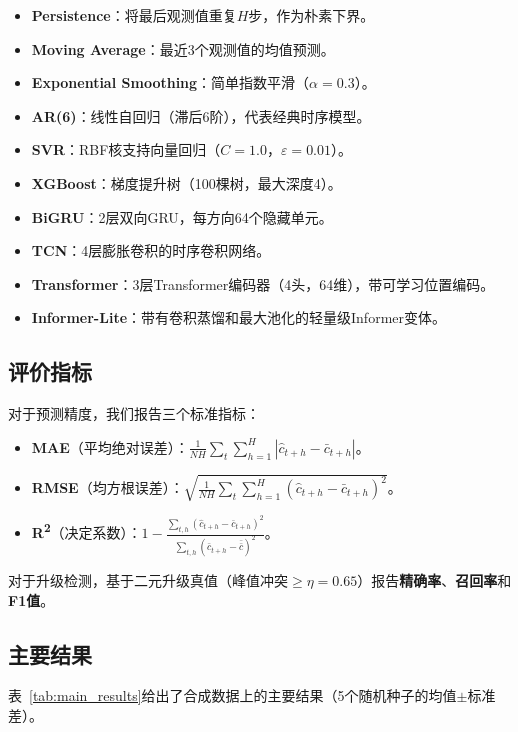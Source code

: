 \documentclass[conference]{IEEEtran}
\begin{document}
\begin{itemize}
\item \textbf{Persistence}：将最后观测值重复$H$步，作为朴素下界。
\item \textbf{Moving Average}：最近3个观测值的均值预测。
\item \textbf{Exponential Smoothing}：简单指数平滑（$\alpha{=}0.3$）。
\item \textbf{AR(6)}：线性自回归（滞后6阶），代表经典时序模型。
\item \textbf{SVR}：RBF核支持向量回归（$C{=}1.0$，$\varepsilon{=}0.01$）。
\item \textbf{XGBoost}：梯度提升树（100棵树，最大深度4）。
\item \textbf{BiGRU}：2层双向GRU，每方向64个隐藏单元。
\item \textbf{TCN}：4层膨胀卷积的时序卷积网络。
\item \textbf{Transformer}：3层Transformer编码器（4头，64维），带可学习位置编码。
\item \textbf{Informer-Lite}：带有卷积蒸馏和最大池化的轻量级Informer变体。
\end{itemize}

\subsection{评价指标}

对于预测精度，我们报告三个标准指标：

\begin{itemize}
\item \textbf{MAE}（平均绝对误差）：$\frac{1}{N H}\sum_{t}\sum_{h=1}^{H}|\hat{c}_{t+h}-\bar{c}_{t+h}|$。
\item \textbf{RMSE}（均方根误差）：$\sqrt{\frac{1}{N H}\sum_{t}\sum_{h=1}^{H}(\hat{c}_{t+h}-\bar{c}_{t+h})^2}$。
\item \textbf{R\textsuperscript{2}}（决定系数）：$1 - \frac{\sum_{t,h}(\hat{c}_{t+h}-\bar{c}_{t+h})^2}{\sum_{t,h}(\bar{c}_{t+h}-\bar{\bar{c}})^2}$。
\end{itemize}

对于升级检测，基于二元升级真值（峰值冲突$\ge\eta{=}0.65$）报告\textbf{精确率}、\textbf{召回率}和\textbf{F1值}。

\subsection{主要结果}

表~\ref{tab:main_results}给出了合成数据上的主要结果（5个随机种子的均值$\pm$标准差）。
\end{document}
